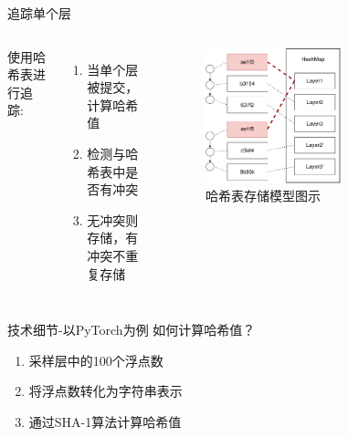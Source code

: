 \documentclass{beamer}
\begin{document}
\begin{frame}{追踪单个层}
\begin{columns}
使用哈希表进行追踪:
\begin{enumerate}
    \item 当单个层被提交，计算哈希值
    \item 检测与哈希表中是否有冲突
    \item 无冲突则存储，有冲突不重复存储
\end{enumerate}
\begin{figure}
    \centering
    \includegraphics[width=0.6\textwidth]{hashmap.pdf}
    \caption{哈希表存储模型图示}
    \label{fig:hashmap}
\end{figure}
\end{columns}

\end{frame}

\begin{frame}{技术细节-以PyTorch为例}
如何计算哈希值？
\begin{enumerate}
    \item 采样层中的100个浮点数
    \item 将浮点数转化为字符串表示
    \item 通过SHA-1算法计算哈希值
\end{enumerate}
\end{frame}
\end{document}
